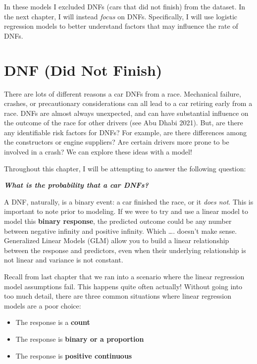 \documentclass[
]{book}
\providecommand{\tightlist}{%
  \setlength{\itemsep}{0pt}\setlength{\parskip}{0pt}}
\begin{document}
In these models I excluded DNFs (cars that did not finish) from the dataset. In the next chapter, I will instead \emph{focus} on DNFs. Specifically, I will use logistic regression models to better understand factors that may influence the rate of DNFs.

\hypertarget{dnf-did-not-finish}{%
\chapter{DNF (Did Not Finish)}\label{dnf-did-not-finish}}

There are lots of different reasons a car DNFs from a race. Mechanical failure, crashes, or precautionary considerations can all lead to a car retiring early from a race. DNFs are almost always unexpected, and can have substantial influence on the outcome of the race for other drivers (see Abu Dhabi 2021). But, are there any identifiable risk factors for DNFs? For example, are there differences among the constructors or engine suppliers? Are certain drivers more prone to be involved in a crash? We can explore these ideas with a model!

Throughout this chapter, I will be attempting to answer the following question:

\textbf{\emph{What is the probability that a car DNFs?}}

A DNF, naturally, is a binary event: a car finished the race, or it \emph{does not}. This is important to note prior to modeling. If we were to try and use a linear model to model this \textbf{binary response}, the predicted outcome could be any number between negative infinity and positive infinity. Which \ldots. doesn't make sense. Generalized Linear Models (GLM) allow you to build a linear relationship between the response and predictors, even when their underlying relationship is not linear and variance is not constant.

Recall from last chapter that we ran into a scenario where the linear regression model assumptions fail. This happens quite often actually! Without going into too much detail, there are three common situations where linear regression models are a poor choice:

\begin{itemize}
\tightlist
\item
  The response is a \textbf{count}
\item
  The response is \textbf{binary or a proportion}
\item
  The response is \textbf{positive continuous}
\end{itemize}
\end{document}
